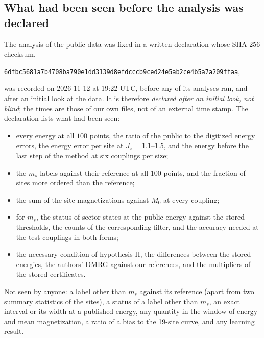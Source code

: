 \documentclass[aps,prx,onecolumn,10pt,nofootinbib,longbibliography,floatfix]{revtex4-2}
\theoremstyle{remark}
\newcommand{\Jz}{J_z}
\newcommand{\ms}{m_s}
\begin{document}
\subsection{What had been seen before the analysis was declared}
\label{sm:public_seen}
The analysis of the public data was fixed in a written declaration whose SHA-256 checksum, %
\begin{center}
\texttt{6dfbc5681a7b4708ba790e1dd3139d8efdcccb9ced24e5ab2ce4b5a7a209ffaa},
\end{center}
was recorded on 2026-11-12 at 19:22 UTC, before any of its analyses ran, and after an initial look at the data. %
It is therefore \emph{declared after an initial look, not blind}; the times are those of our own files, not of an
external time stamp. The declaration lists what had been seen:
\begin{itemize}
\item every energy at all $100$ points, the ratio of the public to the digitized energy errors, the energy error per %
site at $\Jz=1.1$--$1.5$, and the energy before the last step of the method at six couplings per size;
\item the $\ms$ labels against their reference at all $100$ points, and the fraction of sites more ordered than the %
reference;
\item the sum of the site magnetizations against $M_0$ at every coupling;
\item for $\ms$, the status of sector states at the public energy against the stored thresholds, the counts of the
corresponding filter, and the accuracy needed at the test couplings in both forms;
\item the necessary condition of hypothesis H, the differences between the stored energies, the authors' DMRG
against our references, and the multipliers of the stored certificates.
\end{itemize}
Not seen by anyone: a label other than $\ms$ against its reference (apart from two summary statistics of the
sites), a status of a label other than $\ms$, an exact interval or its width at a published energy, any quantity in
the window of energy and mean magnetization, a ratio of a bias to the 19-site curve, and any learning result.
\end{document}
